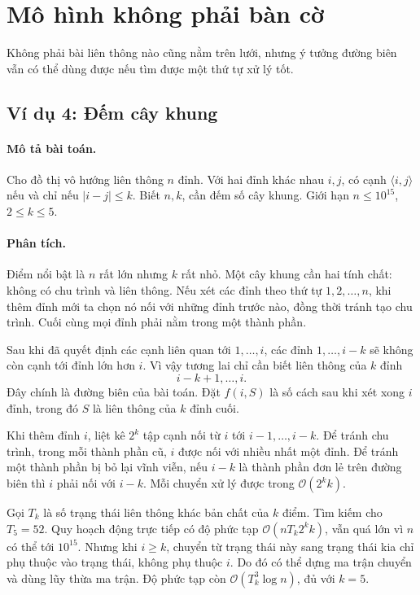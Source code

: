 \documentclass[11pt]{article}
\newcommand{\Oh}{\mathcal{O}}
\begin{document}
\section{Mô hình không phải bàn cờ}

Không phải bài liên thông nào cũng nằm trên lưới, nhưng ý tưởng đường biên vẫn
có thể dùng được nếu tìm được một thứ tự xử lý tốt.

\subsection{Ví dụ 4: Đếm cây khung}

\paragraph{Mô tả bài toán.}
Cho đồ thị vô hướng liên thông \(n\) đỉnh. Với hai đỉnh khác nhau \(i,j\),
có cạnh \(\langle i,j\rangle\) nếu và chỉ nếu \(|i-j|\le k\). Biết \(n,k\),
cần đếm số cây khung. Giới hạn \(n\le 10^{15}\), \(2\le k\le 5\).

\paragraph{Phân tích.}
Điểm nổi bật là \(n\) rất lớn nhưng \(k\) rất nhỏ. Một cây khung cần hai tính
chất: không có chu trình và liên thông. Nếu xét các đỉnh theo thứ tự
\(1,2,\ldots,n\), khi thêm đỉnh mới ta chọn nó nối với những đỉnh trước nào,
đồng thời tránh tạo chu trình. Cuối cùng mọi đỉnh phải nằm trong một thành
phần.

Sau khi đã quyết định các cạnh liên quan tới \(1,\ldots,i\), các đỉnh
\(1,\ldots,i-k\) sẽ không còn cạnh tới đỉnh lớn hơn \(i\). Vì vậy tương lai chỉ
cần biết liên thông của \(k\) đỉnh
\[
  i-k+1,\ldots,i.
\]
Đây chính là đường biên của bài toán. Đặt \(f(i,S)\) là số cách sau khi xét
xong \(i\) đỉnh, trong đó \(S\) là liên thông của \(k\) đỉnh cuối.

Khi thêm đỉnh \(i\), liệt kê \(2^k\) tập cạnh nối từ \(i\) tới
\(i-1,\ldots,i-k\). Để tránh chu trình, trong mỗi thành phần cũ, \(i\) được
nối với nhiều nhất một đỉnh. Để tránh một thành phần bị bỏ lại vĩnh viễn, nếu
\(i-k\) là thành phần đơn lẻ trên đường biên thì \(i\) phải nối với \(i-k\).
Mỗi chuyển xử lý được trong \(\Oh(2^k k)\).

Gọi \(T_k\) là số trạng thái liên thông khác bản chất của \(k\) điểm. Tìm kiếm
cho \(T_5=52\). Quy hoạch động trực tiếp có độ phức tạp
\(\Oh(n T_k 2^k k)\), vẫn quá lớn vì \(n\) có thể tới \(10^{15}\). Nhưng khi
\(i\ge k\), chuyển từ trạng thái này sang trạng thái kia chỉ phụ thuộc vào
trạng thái, không phụ thuộc \(i\). Do đó có thể dựng ma trận chuyển và dùng
lũy thừa ma trận. Độ phức tạp còn \(\Oh(T_k^3\log n)\), đủ với \(k=5\).
\end{document}
